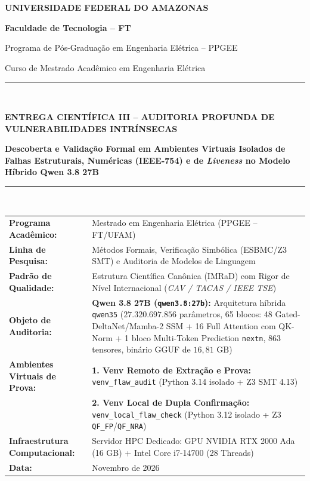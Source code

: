 \documentclass[11pt,a4paper]{article}
\theoremstyle{definition}
\begin{document}
\begin{titlepage}
    \centering
    \vspace*{0.3cm}
    {\Huge\bfseries\color{ufamblue} UNIVERSIDADE FEDERAL DO AMAZONAS \par}
    \vspace{0.25cm}
    {\Large\bfseries Faculdade de Tecnologia -- FT \par}
    {\large Programa de Pós-Graduação em Engenharia Elétrica -- PPGEE \par}
    {\normalsize Curso de Mestrado Acadêmico em Engenharia Elétrica \par}
    \vspace{0.85cm}
    
    \rule{\linewidth}{1.5pt} \\[0.35cm]
    {\large\bfseries ENTREGA CIENTÍFICA III -- AUDITORIA PROFUNDA DE VULNERABILIDADES INTRÍNSECAS \par}
    \vspace{0.25cm}
    {\LARGE\bfseries Descoberta e Validação Formal em Ambientes Virtuais Isolados de Falhas Estruturais, Numéricas (IEEE-754) e de \textit{Liveness} no Modelo Híbrido Qwen 3.8 27B \par}
    \rule{\linewidth}{1.5pt} \\[0.75cm]
    
    \begin{minipage}{0.98\textwidth}
        \small
        \begin{tabularx}{\linewidth}{l X}
            \textbf{Programa Acadêmico:} & Mestrado em Engenharia Elétrica (PPGEE -- FT/UFAM) \\
            \textbf{Linha de Pesquisa:} & Métodos Formais, Verificação Simbólica (ESBMC/Z3 SMT) e Auditoria de Modelos de Linguagem \\
            \textbf{Padrão de Qualidade:} & Estrutura Científica Canônica (IMRaD) com Rigor de Nível Internacional (\textit{CAV / TACAS / IEEE TSE}) \\
            \textbf{Objeto de Auditoria:} & \textbf{Qwen 3.8 27B (\texttt{qwen3.8:27b}):} Arquitetura híbrida \texttt{qwen35} ($27.320.697.856$ parâmetros, 65 blocos: 48 Gated-DeltaNet/Mamba-2 SSM + 16 Full Attention com QK-Norm + 1 bloco Multi-Token Prediction \texttt{nextn}, 863 tensores, binário GGUF de $16{,}81\text{ GB}$) \\
            \textbf{Ambientes Virtuais de Prova:} & \textbf{1. Venv Remoto de Extração e Prova:} \texttt{venv\_flaw\_audit} (Python 3.14 isolado + Z3 SMT 4.13) \\
            & \textbf{2. Venv Local de Dupla Confirmação:} \texttt{venv\_local\_flaw\_check} (Python 3.12 isolado + Z3 \texttt{QF\_FP}/\texttt{QF\_NRA}) \\
            \textbf{Infraestrutura Computacional:} & Servidor HPC Dedicado: GPU NVIDIA RTX 2000 Ada (16 GB) + Intel Core i7-14700 (28 Threads) \\
            \textbf{Data:} & Novembro de 2026
        \end{tabularx}
    \end{minipage}
    

\end{titlepage}
\end{document}
